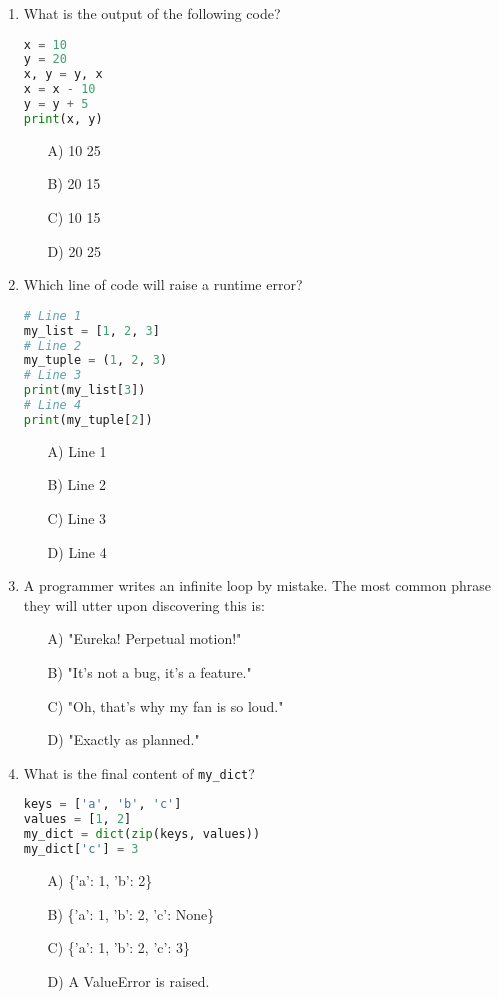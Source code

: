 \documentclass[9pt]{article}
\begin{document}
\begin{multicols}{2}
\begin{enumerate}
\item What is the output of the following code?
\begin{lstlisting}[language=Python]
x = 10
y = 20
x, y = y, x
x = x - 10
y = y + 5
print(x, y)
\end{lstlisting}
\begin{enumerate}
\item[A)] 10 25
\item[B)] 20 15
\item[C)] 10 15
\item[D)] 20 25
\end{enumerate}

\item Which line of code will raise a runtime error?
\begin{lstlisting}[language=Python]
# Line 1
my_list = [1, 2, 3]
# Line 2
my_tuple = (1, 2, 3)
# Line 3
print(my_list[3])
# Line 4
print(my_tuple[2])
\end{lstlisting}
\begin{enumerate}
\item[A)] Line 1
\item[B)] Line 2
\item[C)] Line 3
\item[D)] Line 4
\end{enumerate}

\item A programmer writes an infinite loop by mistake. The most common phrase they will utter upon discovering this is:
\begin{enumerate}
    \item[A)] "Eureka! Perpetual motion!"
    \item[B)] "It's not a bug, it's a feature."
    \item[C)] "Oh, that's why my fan is so loud."
    \item[D)] "Exactly as planned."
\end{enumerate}

\item What is the final content of \texttt{my\_dict}?
\begin{lstlisting}[language=Python]
keys = ['a', 'b', 'c']
values = [1, 2]
my_dict = dict(zip(keys, values))
my_dict['c'] = 3
\end{lstlisting}
\begin{enumerate}
\item[A)] \{'a': 1, 'b': 2\}
\item[B)] \{'a': 1, 'b': 2, 'c': None\}
\item[C)] \{'a': 1, 'b': 2, 'c': 3\}
\item[D)] A ValueError is raised.
\end{enumerate}


\end{enumerate}
\end{multicols}
\end{document}
